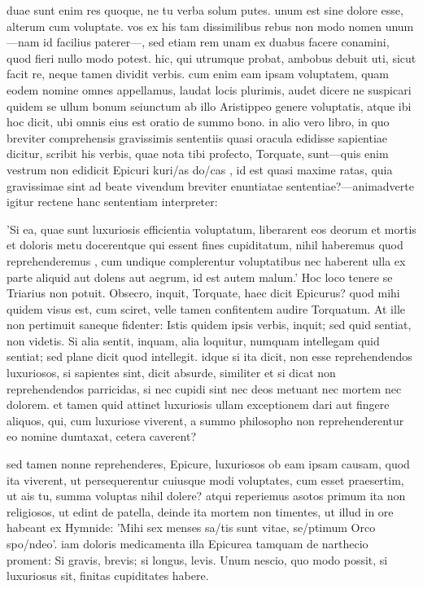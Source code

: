  duae sunt enim res quoque, ne tu verba solum putes. unum est sine dolore esse, alterum cum voluptate. vos ex his tam dissimilibus rebus non modo nomen unum —nam id facilius paterer—, sed etiam rem unam ex duabus facere conamini, quod fieri nullo modo potest. hic, qui utrumque probat, ambobus debuit uti, sicut facit re, neque tamen dividit verbis. cum enim eam ipsam voluptatem, quam eodem nomine omnes appellamus, laudat locis plurimis, audet dicere ne suspicari quidem se ullum bonum seiunctum ab illo Aristippeo genere voluptatis, atque ibi hoc dicit, ubi omnis eius est oratio de summo bono. in alio vero libro, in quo breviter comprehensis gravissimis sententiis quasi oracula edidisse sapientiae dicitur, scribit his verbis, quae nota tibi profecto, Torquate, sunt—quis enim vestrum non edidicit Epicuri kuri/as do/cas , id est quasi maxime ratas, quia gravissimae sint ad beate vivendum breviter enuntiatae sententiae?—animadverte igitur rectene hanc sententiam interpreter:

 'Si ea, quae sunt luxuriosis efficientia voluptatum, liberarent eos deorum et mortis et doloris metu docerentque qui essent fines cupiditatum, nihil haberemus quod reprehenderemus , cum undique complerentur voluptatibus nec haberent ulla ex parte aliquid aut dolens aut aegrum, id est autem malum.' Hoc loco tenere se Triarius non potuit. Obsecro, inquit, Torquate, haec dicit Epicurus? quod mihi quidem visus est, cum sciret, velle tamen confitentem audire Torquatum. At ille non pertimuit saneque fidenter: Istis quidem ipsis verbis, inquit; sed quid sentiat, non videtis. Si alia sentit, inquam, alia loquitur, numquam intellegam quid sentiat; sed plane dicit quod intellegit. idque si ita dicit, non esse reprehendendos luxuriosos, si sapientes sint, dicit absurde, similiter et si dicat non reprehendendos parricidas, si nec cupidi sint nec deos metuant nec mortem nec dolorem. et tamen quid attinet luxuriosis ullam exceptionem dari aut fingere aliquos, qui, cum luxuriose viverent, a summo philosopho non reprehenderentur eo nomine dumtaxat, cetera caverent?

 sed tamen nonne reprehenderes, Epicure, luxuriosos ob eam ipsam causam, quod ita viverent, ut persequerentur cuiusque modi voluptates, cum esset praesertim, ut ais tu, summa voluptas nihil dolere? atqui reperiemus asotos primum ita non religiosos, ut edint de patella, deinde ita mortem non timentes, ut illud in ore habeant ex Hymnide: 'Mihi sex menses sa/tis sunt vitae, se/ptimum Orco spo/ndeo'. iam doloris medicamenta illa Epicurea tamquam de narthecio proment: Si gravis, brevis; si longus, levis. Unum nescio, quo modo possit, si luxuriosus sit, finitas cupiditates habere.

